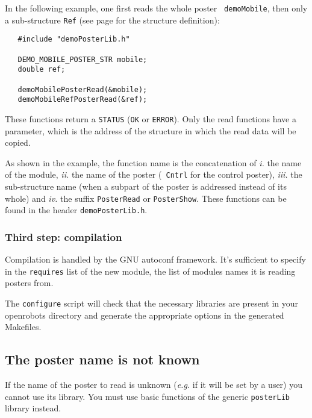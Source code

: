 In  the  following  example, one  first   reads   the whole poster   {\tt
demoMobile}, then only a sub-structure {\tt Ref} (see page
\pageref{typedef|demomobile} for the structure definition):

\begin{center}\begin{cartouche}\small\begin{verbatim}
   #include "demoPosterLib.h"

   DEMO_MOBILE_POSTER_STR mobile;
   double ref;

   demoMobilePosterRead(&mobile);
   demoMobileRefPosterRead(&ref);
\end{verbatim}\end{cartouche}\end{center}

These functions return a {\tt STATUS} ({\tt OK} or {\tt ERROR}). Only the
read functions have a parameter, which is the address of the structure in
which the read data will be copied.

As shown in the example, the  function name is  the concatenation of {\em
i.} the name  of  the module, {\em ii.}   the  name of the  poster  ({\tt
Cntrl} for the control poster), {\em  iii.}  the sub-structure name (when
a subpart of the poster is addressed instead of  its whole) and {\em iv.}
the suffix {\tt PosterRead} or {\tt PosterShow}.   These functions can be
found in the header {\tt demoPosterLib.h}.


\subsubsection{Third step: compilation}

Compilation is handled by the GNU autoconf framework. 
It's sufficient to specify in the \texttt{requires} list of the new
module, the list of modules names it is reading posters from.  

The \texttt{configure} script will check that the necessary libraries
are present in your openrobots directory and generate the appropriate
options in the generated Makefiles.
  


\subsection{The poster name is not known}

If the name of the  poster to read is unknown  ({\em e.g.} if it will  be
set by a user) you  cannot use its  library. You must use basic functions
of the generic {\tt posterLib} library instead.

